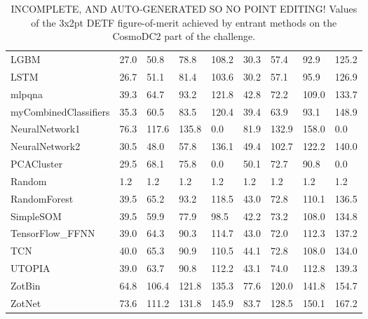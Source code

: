 \documentclass[twocolumn,twocolappendix]{aastex63}
\begin{document}
\begin{table*}[]
\begin{tabular}{|l|llll|llll|}
{\sc LGBM } & 27.0 & 50.8    & 78.8    & 108.2    & 30.3             & 57.4             & 92.9             & 125.2\\
{\sc LSTM } & 26.7 & 51.1    & 81.4    & 103.6    & 30.2             & 57.1             & 95.9             & 126.9\\
{\sc mlpqna } & 39.3 & 64.7    & 93.2    & 121.8    & 42.8             & 72.2             & 109.0             & 133.7\\
{\sc myCombinedClassifiers } & 35.3 & 60.5    & 83.5    & 120.4    & 39.4             & 63.9             & 93.1             & 148.9\\
{\sc NeuralNetwork1 } & 76.3 & 117.6    & 135.8    & 0.0    & 81.9             & 132.9             & 158.0             & 0.0\\
{\sc NeuralNetwork2 } & 30.5 & 48.0    & 57.8    & 136.1    & 49.4             & 102.7             & 122.2             & 140.0\\
{\sc PCACluster } & 29.5 & 68.1    & 75.8    & 0.0    & 50.1             & 72.7             & 90.8             & 0.0\\
{\sc Random } & 1.2 & 1.2    & 1.2    & 1.2    & 1.2             & 1.2             & 1.2             & 1.2\\
{\sc RandomForest } & 39.5 & 65.2    & 93.2    & 118.5    & 43.0             & 72.8             & 110.1             & 136.5\\
{\sc SimpleSOM } & 39.5 & 59.9    & 77.9    & 98.5    & 42.2             & 73.2             & 108.0             & 134.8\\
{\sc TensorFlow\_FFNN } & 39.0 & 64.3    & 90.3    & 114.7    & 43.0             & 72.0             & 112.3             & 137.2\\
{\sc TCN } & 40.0 & 65.3    & 90.9    & 110.5    & 44.1             & 72.8             & 108.0             & 134.0\\
{\sc UTOPIA } & 39.0 & 63.7    & 90.8    & 112.2    & 43.1             & 74.0             & 112.8             & 139.3\\
{\sc ZotBin } & 64.8 & 106.4    & 121.8    & 135.3    & 77.6             & 120.0             & 141.8             & 154.7\\
{\sc ZotNet } & 73.6 & 111.2    & 131.8    & 145.9    & 83.7             & 128.5             & 150.1             & 167.2\\
\end{tabular}
\caption{INCOMPLETE, AND AUTO-GENERATED SO NO POINT EDITING! Values of the 3x2pt DETF figure-of-merit achieved by entrant methods on the 
CosmoDC2 part of the challenge.}
\label{tab:cosmodc2}
\end{table*}
\end{document}

